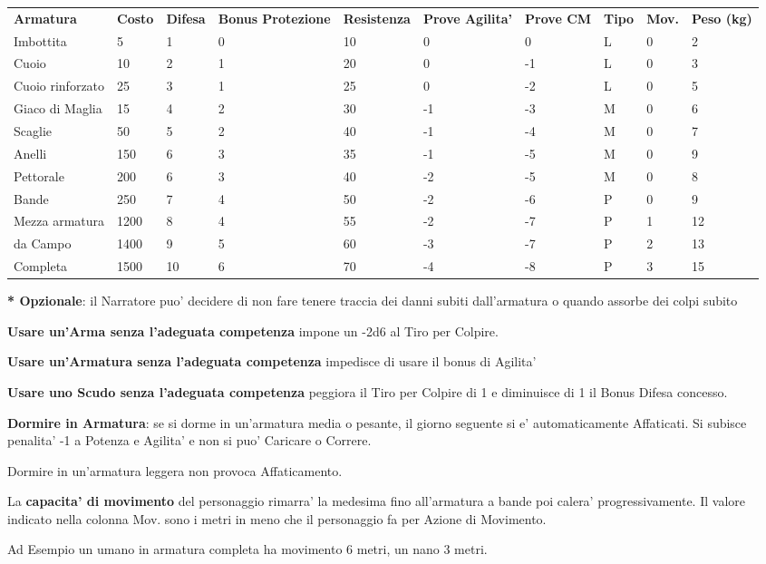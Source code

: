 \documentclass[a4paper,11pt,twoside,openany]{book}
\begin{document}
{\label{tabella-armature}
\begin{tabular}{L{2cm} L{1.2cm} L{1.3cm} L{2cm} L{1.3cm} L{1.5cm} L{1.5cm}L{1cm}L{1cm}L{1cm}} 
\toprule
\textbf{Armatura} &\textbf{Costo} & \textbf{Difesa} & \textbf{Bonus Protezione }& \textbf{Resistenza} & \textbf{Prove Agilita’} & \textbf{Prove CM} & \textbf{Tipo} & \textbf{Mov.} & \textbf{Peso (kg)}\tabularnewline
Imbottita & 5 & 1 & 0 & 10 & 0 & 0 & L & 0 & 2\tabularnewline
Cuoio & 10 & 2 & 1 & 20 & 0 & -1 & L & 0 & 3\tabularnewline
Cuoio rinforzato & 25 & 3 & 1 & 25 & 0 & -2 & L & 0 & 5\tabularnewline
Giaco di Maglia & 15 & 4 & 2 & 30 & -1 & -3 & M & 0 & 6\tabularnewline
Scaglie & 50 & 5 & 2 & 40 & -1 & -4 & M & 0 & 7\tabularnewline
Anelli & 150 & 6 & 3 & 35 & -1 & -5 & M & 0 & 9\tabularnewline
Pettorale & 200 & 6 & 3 & 40 & -2 & -5 & M & 0 & 8\tabularnewline
Bande & 250 & 7 & 4 & 50 & -2 & -6 & P & 0 & 9\tabularnewline
Mezza armatura & 1200 & 8 & 4 & 55 & -2 & -7 & P & 1 & 12\tabularnewline
da Campo & 1400 & 9 & 5 & 60 & -3 & -7 & P & 2 & 13\tabularnewline
Completa & 1500 & 10 & 6 & 70 & -4 & -8 & P & 3 & 15\tabularnewline
\end{tabular}

\textbf{{*} Opzionale}: il Narratore puo' decidere di non fare tenere traccia dei danni subiti dall'armatura o quando assorbe dei colpi subito

\bigskip

\textbf{Usare un'Arma senza l'adeguata competenza} impone un -2d6 al Tiro per Colpire.

\textbf{Usare un'Armatura senza l'adeguata competenza} impedisce di usare il bonus di Agilita'

\textbf{Usare uno Scudo senza l'adeguata competenza} peggiora il Tiro per Colpire di 1 e diminuisce di 1 il Bonus Difesa concesso.

\textbf{Dormire in Armatura}: se si dorme in un'armatura media o pesante, il giorno seguente si e' automaticamente Affaticati. Si subisce penalita' -1 a Potenza e Agilita' e non si puo' Caricare o Correre.

Dormire in un'armatura leggera non provoca Affaticamento.

La \textbf{capacita' di movimento} del personaggio rimarra' la medesima fino all'armatura a bande poi calera' progressivamente. Il valore indicato nella colonna Mov. sono i metri in meno che il personaggio fa per Azione di Movimento.

Ad Esempio un umano in armatura completa ha movimento 6 metri, un nano 3 metri. 

}
\end{document}

